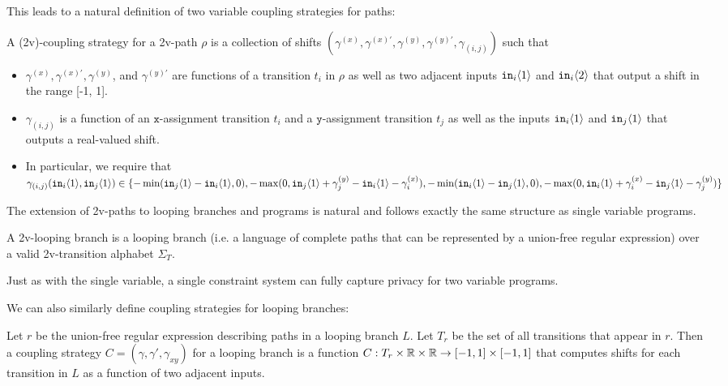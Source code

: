 This leads to a natural definition of two variable coupling strategies for paths:

\begin{defn}
    A (2v)-coupling strategy for a 2v-path $\rho$ is a collection of shifts $(\gamma^{(x)}, \gamma^{(x)\prime}, \gamma^{(y)}, \gamma^{(y)\prime}, \gamma_{(i, j)})$ such that \begin{itemize}
        \item $\gamma^{(x)}, \gamma^{(x)\prime}, \gamma^{(y)}$, and $\gamma^{(y)\prime}$ are functions of a transition $t_i$ in $\rho$ as well as two adjacent inputs $\texttt{in}_i\langle1 \rangle$ and $\texttt{in}_i\langle2 \rangle$ that output a shift in the range [-1, 1]. 
        \item $\gamma_{(i, j)}$ is a function of an $\texttt{x}$-assignment transition $t_i$ and a $\texttt{y}$-assignment transition $t_j$ as well as the inputs $\texttt{in}_{i}\langle1 \rangle$ and $\texttt{in}_j\langle1 \rangle$ that outputs a real-valued shift. 
        \item In particular, we require that $\gamma_{(i, j)}(\texttt{in}_{i}\langle1 \rangle,\texttt{in}_{j}\langle1 \rangle) \in \{-\min(\texttt{in}_{j}\langle1 \rangle-\texttt{in}_{i}\langle1 \rangle, 0),-\max(0, \texttt{in}_{j}\langle1 \rangle+ \gamma_{j}^{(y)}-\texttt{in}_{i}\langle1 \rangle-\gamma_{i}^{(x)}), -\min(\texttt{in}_{i}\langle1 \rangle-\texttt{in}_{j}\langle1 \rangle, 0), -\max(0, \texttt{in}_{i}\langle1 \rangle+ \gamma_{i}^{(x)}-\texttt{in}_{j}\langle1 \rangle-\gamma_{j}^{(y)})\}$
    \end{itemize}
\end{defn}

The extension of 2v-paths to looping branches and programs is natural and follows exactly the same structure as single variable programs. 


\begin{defn}
    A 2v-looping branch is a looping branch (i.e. a language of complete paths that can be represented by a union-free regular expression) over a valid 2v-transition alphabet $\Sigma_T$.
\end{defn}

Just as with the single variable, a single constraint system can fully capture privacy for two variable programs.

We can also similarly define coupling strategies for looping branches:

\begin{defn}
    Let $r$ be the union-free regular expression describing paths in a looping branch $L$. Let $T_r$ be the set of all transitions that appear in $r$. Then a coupling strategy $C = (\gamma, \gamma', \gamma_{xy})$ for a looping branch is a function $C:T_r\times\mathbb{R} \times\mathbb{R}\to [-1, 1]\times[-1, 1]$ that computes shifts for each transition in $L$ as a function of two adjacent inputs.
\end{defn}

